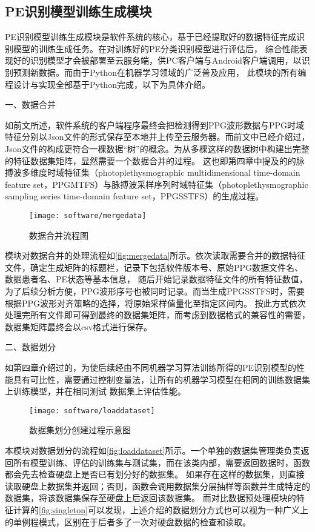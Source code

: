 \subsection{PE识别模型训练生成模块}
PE识别模型训练生成模块是软件系统的核心，基于已经提取好的数据特征完成识别模型的训练生成任务。在对训练好的PE分类识别模型进行评估后，
综合性能表现好的识别模型才会被部署至云服务端，供PC客户端与Android客户端调用，以识别预测新数据。而由于Python在机器学习领域的广泛普及应用，
此模块的所有编程设计与实现全部基于Python完成，以下为具体介绍。

一、数据合并

如前文所述，软件系统的客户端程序最终会把检测得到PPG波形数据与PPG时域特征分别以Json文件的形式保存至本地并上传至云服务器。而前文中已经介绍过，
Json文件的构成更符合一棵数据“树”的概念。为从多棵这样的数据树中构建出完整的特征数据集矩阵，显然需要一个数据合并的过程。
这也即第四章中提及的的脉搏波多维度时域特征集（photoplethysmographic multidimensional
time-domain feature set，PPGMTFS）与脉搏波采样序列时域特征集（photoplethysmographic sampling series time-domain feature set，PPGSSTFS）的生成过程。
\begin{figure}[htbp]
    \centering
    \texttt{[image: software/mergedata]}
    \caption{\label{fig:mergedata}数据合并流程图}
\end{figure}

模块对数据合并的处理流程如\autoref{fig:mergedata}所示。依次读取需要合并的数据特征文件，确定生成矩阵的标题栏，记录下包括软件版本号、原始PPG数据文件名、数据患者名、PE状态等基本信息，
随后开始记录数据特征文件的所有特征数值，为了后续分析方便，PPG波形序号也被同时记录。而当生成PPGSSTFS时，需要根据PPG波形对齐策略的选择，将原始采样值量化至指定区间内。
按此方式依次处理完所有文件即可得到最终的数据集矩阵，而考虑到数据格式的兼容性的需要，数据集矩阵最终会以csv格式进行保存。

二、数据划分

如第四章介绍过的，为使后续经由不同机器学习算法训练所得的PE识别模型的性能具有可比性，需要通过控制变量法，让所有的机器学习模型在相同的训练数据集上训练模型，并在相同测试
数据集上评估性能。
\begin{figure}[htbp]
    \centering
    \texttt{[image: software/loaddataset]}
    \caption{\label{fig:loaddataset}数据集划分创建过程示意图}
\end{figure}

本模块对数据划分的流程如\autoref{fig:loaddataset}所示。一个单独的数据集管理类负责返回所有模型训练、评估的训练集与测试集，而在该类内部，需要返回数据时，函数都会先去检查硬盘上是否已有划分好的数据集。
如果存在这样的数据集，则直接读取硬盘上数据集并返回；否则，函数会调用数据集分层抽样等函数并生成特定的数据集，将该数据集保存至硬盘上后返回该数据集。
而对比数据预处理模块的特征计算的\autoref{fig:singleton}可以发现，上述介绍的数据划分方式也可以视为一种广义上的单例程模式，区别在于后者多了一次对硬盘数据的检查和读取。

